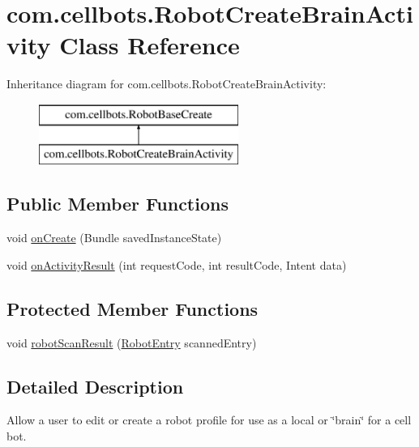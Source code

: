 \hypertarget{classcom_1_1cellbots_1_1_robot_create_brain_activity}{\section{com.\-cellbots.\-Robot\-Create\-Brain\-Activity Class Reference}
\label{classcom_1_1cellbots_1_1_robot_create_brain_activity}
}
Inheritance diagram for com.\-cellbots.\-Robot\-Create\-Brain\-Activity\-:\begin{figure}[H]
\begin{center}
\leavevmode
\includegraphics[height=2.000000cm]{classcom_1_1cellbots_1_1_robot_create_brain_activity}
\end{center}
\end{figure}
\subsection*{Public Member Functions}
\begin{DoxyCompactItemize}
\item 
void \hyperlink{classcom_1_1cellbots_1_1_robot_create_brain_activity_a8d8a870b866a9ef2b5e51489c313fe86}{on\-Create} (Bundle saved\-Instance\-State)
\item 
void \hyperlink{classcom_1_1cellbots_1_1_robot_create_brain_activity_ae85c44b0c0f15f929f86976ab06769db}{on\-Activity\-Result} (int request\-Code, int result\-Code, Intent data)
\end{DoxyCompactItemize}
\subsection*{Protected Member Functions}
\begin{DoxyCompactItemize}
\item 
void \hyperlink{classcom_1_1cellbots_1_1_robot_create_brain_activity_a22371759d135bf54e7a56b6dbd9e0dc2}{robot\-Scan\-Result} (\hyperlink{classcom_1_1cellbots_1_1_robot_entry}{Robot\-Entry} scanned\-Entry)
\end{DoxyCompactItemize}


\subsection{Detailed Description}
Allow a user to edit or create a robot profile for use as a local or \char`\"{}brain\char`\"{} for a cell bot.

